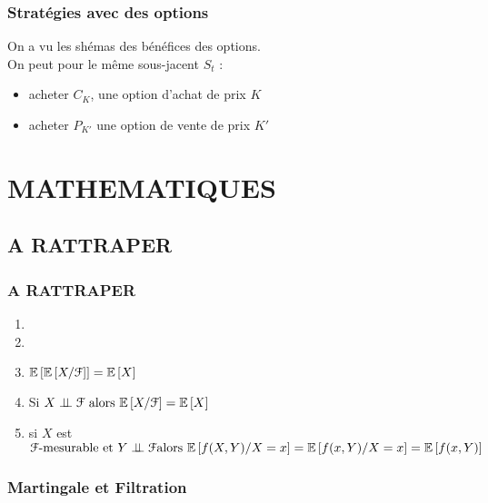 \documentclass{report}
\newcommand{\indep}{\perp \!\!\! \perp}
\begin{document}
\subsection{Stratégies avec des options}
On a vu les shémas des bénéfices des options.\\
On peut pour le même sous-jacent $S_t$ : 
\begin{itemize}
    \item acheter $C_K$, une option d'achat de prix $K$
    \item acheter $P_{K'}$ une option de vente de prix $K'$
\end{itemize}









\chapter{MATHEMATIQUES}
\setcounter{section}{0}
\section{A RATTRAPER}

\subsection{A RATTRAPER}
\begin{enumerate}
    \item 
    \item
    \item $\mathbb{E}\left[\mathbb{E}\left[ X/\EuScript{F}\right]\right] = \mathbb{E}\left[X\right]$
    \item Si $X\indep \EuScript{F} \mbox{ alors } \mathbb{E}\left[ X/\EuScript{F}\right] = \mathbb{E}\left[X\right]$
    \item si $X$ est $\EuScript{F}\mbox{-mesurable et }Y\indep\EuScript{F}\\ \mbox{alors }\mathbb{E}\left[ f(X,Y) /X=x\right] = \mathbb{E}\left[ f(x,Y) /X=x\right] = \mathbb{E}\left[ f(x,Y)\right]$
\end{enumerate}

\subsection{Martingale et Filtration}
\end{document}
